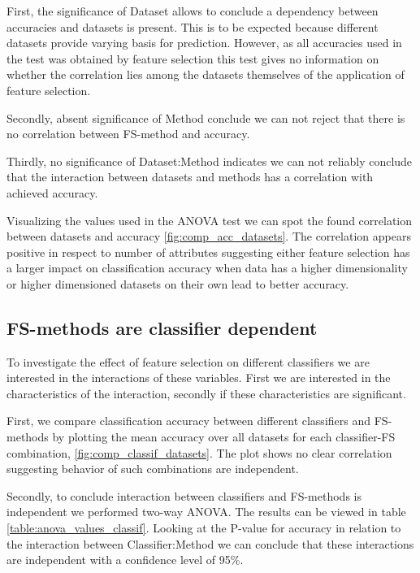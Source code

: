 First, the significance of Dataset allows to conclude a dependency between accuracies and datasets is present. This is to be expected because different datasets provide varying basis for prediction. However, as all accuracies used in the test was obtained by feature selection this test gives no information on whether the correlation lies among the datasets themselves of the application of feature selection.

Secondly, absent significance of Method conclude we can not reject that there is no correlation between FS-method and accuracy.

Thirdly, no significance of Dataset:Method indicates we can not reliably conclude that the interaction between datasets and methods has a correlation with achieved accuracy.

Visualizing the values used in the ANOVA test we can spot the found correlation between datasets and accuracy \ref{fig:comp_acc_datasets}. The correlation appears positive in respect to number of attributes suggesting either feature selection has a larger impact on classification accuracy when data has a higher dimensionality or higher dimensioned datasets on their own lead to better accuracy.



\subsection{FS-methods are classifier dependent}
\label{sec:fs_methods_classifiers}

To investigate the effect of feature selection on different classifiers we are interested in the interactions of these variables. First we are interested in the characteristics of the interaction, secondly if these characteristics are significant.

First, we compare classification accuracy between different classifiers and FS-methods by plotting the mean accuracy over all datasets for each classifier-FS combination, \ref{fig:comp_classif_datasets}. The plot shows no clear correlation suggesting behavior of such combinations are independent.

Secondly, to conclude interaction between classifiers and FS-methods is independent we performed two-way ANOVA. The results can be viewed in table \ref{table:anova_values_classif}. Looking at the P-value for accuracy in relation to the interaction between Classifier:Method we can conclude that these interactions are independent with a confidence level of 95\%.

